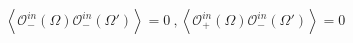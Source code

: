 \begin{equation}
\left<\mathcal{O}^{in}_-(\Omega)
\mathcal{O}^{in}_-(\Omega')\right>=0 \ ,
\left<\mathcal{O}^{in}_+(\Omega)
\mathcal{O}^{in}_-(\Omega')\right>=0 
\end{equation}

